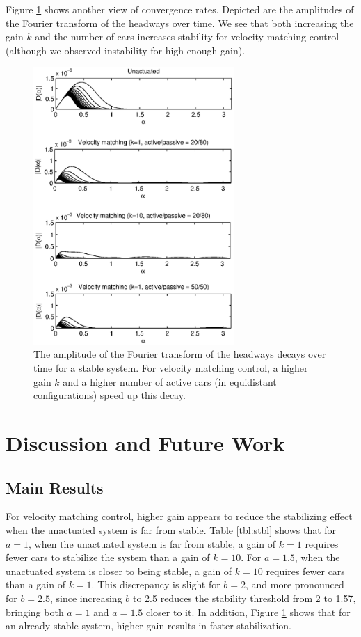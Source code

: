 \documentclass[10pt,twocolumn]{article}
\theoremstyle{ss}
\newcommand{\lm}{\fontfamily{\sfdefault}\selectfont}
\begin{document}
Figure \ref{fig:absfft} shows another view of convergence rates. Depicted are the amplitudes of the Fourier transform of the headways over time. We see that both increasing the gain $k$ and the number of cars increases stability for velocity matching control (although we observed instability for high enough gain).
\begin{figure}[!h]
\lm
\begin{center}
\includegraphics[width=3in]{absfft}
\end{center}
\caption{ \label{fig:absfft} The amplitude of the Fourier transform of the headways decays over time for a stable system. For velocity matching control, a higher gain $k$ and a higher number of active cars (in equidistant configurations) speed up this decay.}
\end{figure}

\section{Discussion and Future Work}

\subsection{Main Results}
For velocity matching control, higher gain appears to reduce the stabilizing effect when the unactuated system is far from stable. Table \ref{tbl:stbl} shows that for $a=1$, when the unactuated system is far from stable, a gain of $k=1$ requires fewer cars to stabilize the system than a gain of $k=10$. For $a=1.5$, when the unactuated system is closer to being stable, a gain of $k=10$ requires fewer cars than a gain of $k=1$. This discrepancy is slight for $b=2$, and more pronounced for $b=2.5$, since increasing $b$ to 2.5 reduces the stability threshold from 2 to 1.57, bringing both $a=1$ and $a=1.5$ closer to it. In addition, Figure \ref{fig:absfft} shows that for an already stable system, higher gain results in faster stabilization.
\end{document}
